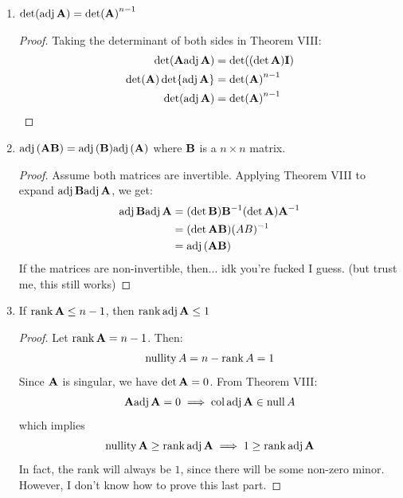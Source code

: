 \documentclass{article}
\begin{document}
\begin{enumerate}
\begin{proof}
\begin{equation*}
                \bff{A}^T\adj(\bff{A})^T = \bff{A}^T\adj(\bff{A}^T)
            \end{equation*}
            If $\bff{A}$ is not the zero matrix, then this directly proves it. If $\bff{A}$ is the zero matrix, then from property $1$, we get: $\adj(\bff{A}^T)=\bff{0}$ and $\adj(\bff{A})^T = \bff{0}^T=\bff{0}$.
        \end{proof}
        \item $\det(\mathrm{adj}\,\mathbf{A})= \det(\mathbf{A})^{n-1}$
        \begin{proof}
            Taking the determinant of both sides in Theorem VIII:
            \begin{align*}
                \det(\mathbf{A}\mathrm{adj}\,\mathbf{A})&=\det((\det \mathbf{A})\mathbf{I}) \\ 
                \det(\mathbf{A})\det{\mathrm{adj}\,\mathbf{A}}&=\det(\mathbf{A})^{n-1} \\ 
                \det(\mathrm{adj}\,\mathbf{A}) &= \det(\mathbf{A})^{n-1}
            \end{align*}
        \end{proof}
        \item $\mathrm{adj}\,(\mathbf{A}\mathbf{B})=\mathrm{adj}\,(\mathbf{B})\mathrm{adj}\,(\mathbf{A})$ where $\mathbf{B}$ is a $n\times n$ matrix.
        \begin{proof}
            Assume both matrices are invertible. Applying Theorem VIII to expand $\mathrm{adj}\,\mathbf{B}\mathrm{adj}\,\mathbf{A}$, we get:
            \begin{align*}
                \mathrm{adj}\,\mathbf{B}\mathrm{adj}\,\mathbf{A} &= (\det \mathbf{B})\mathbf{B}^{-1}(\det \mathbf{A})\mathbf{A}^{-1} \\ 
                &= (\det \mathbf{AB})(AB)^{-1} \\ 
                &= \mathrm{adj}\,(\mathbf{AB})
            \end{align*}
            If the matrices are non-invertible, then... idk you're fucked I guess. (but trust me, this still works)
        \end{proof}
        \item If $\rank \mathbf{A} \le n-1$, then $\rank \mathrm{adj}\,\mathbf{A} \le 1$
        \begin{proof}
            Let $\rank \mathbf{A} = n-1$. Then:
            \begin{equation*}
                \mathrm{nullity}\,A = n - \rank A = 1
            \end{equation*}
            Since $\bff{A}$ is singular, we have $\det \mathbf{A}=0$. From Theorem VIII:
            \begin{equation*}
                \mathbf{A}\mathrm{adj}\,\mathbf{A} = 0 \implies \mathrm{col}\,\mathrm{adj}\,\mathbf{A} \in \mathrm{null}\,A
            \end{equation*}
            which implies
            \begin{equation*}
                \mathrm{nullity}\,\mathbf{A} \ge \rank \mathrm{adj}\,\mathbf{A} \implies 1 \ge \rank \mathrm{adj}\,\mathbf{A}
            \end{equation*}
            In fact, the rank will always be $1$, since there will be some non-zero minor. However, I don't know how to prove this last part.
            \vspace{2mm}


\end{proof}
\end{enumerate}
\end{document}
